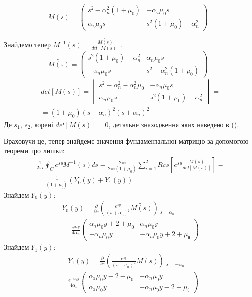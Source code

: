 \begin{equation}
    M(s) = \begin{pmatrix}
        s^2 -\alpha_n^2(1 + \mu_0) & -\alpha_n \mu_0 s \\
        \alpha_n \mu_0 s & s^2 (1 + \mu_0) -\alpha_n^2
     \end{pmatrix}
\end{equation}

Знайдемо тепер $M^{-1}(s) = \frac{\widetilde{M(s)}}{det[M(s)]}$.
\begin{equation}
    \widetilde{M(s)} = \begin{pmatrix}
        s^2 (1 + \mu_0) -\alpha_n^2 & \alpha_n \mu_0 s \\
        -\alpha_n \mu_0 s & s^2 -\alpha_n^2(1 + \mu_0)
     \end{pmatrix}
\end{equation}
\begin{align}
    &det[M(s)] = \begin{vmatrix}
        s^2 - \alpha_n^2 - \alpha_n^2\mu_0 & -\alpha_n \mu_0 s \\
        \alpha_n \mu_0 s & s^2 (1 + \mu_0) -\alpha_n^2
     \end{vmatrix} = \nonumber \\
    &=(1+\mu_0)(s - \alpha_n)^2(s + \alpha_n)^2
\end{align}
Де $s_1$, $s_2$, корені $det[M(s)]=0$, детальне знаходження яких наведено в ().

Враховучи це, тепер знайдемо значення фундаментальної матрицю за допомогою теореми про лишки:
\begin{align*}
    &\frac{1}{2\pi i} \oint_C e^{sy} M^{-1}(s)ds = \frac{2 \pi i}{2 \pi i (1 + \mu_0)} \sum_{i=1}^{2} Res\left[ e^{sy} \frac{\widetilde{M(s)}}{det[M(s)]} \right] = \\
    & = \frac{1}{(1 + \mu_0)} \left(Y_0(y) + Y_1(y) \right)
\end{align*}
Знайдем $Y_0(y)$:
\begin{align}
    &Y_0(y) =  \frac{\partial}{\partial s} \left( \frac{e^{sy}}{(s+\alpha_n)^2} \widetilde{M(s)} \right) \Big|_{s=\alpha_n} = \nonumber \\
    &=\frac{e^{\alpha_n y}}{4\alpha_n} \begin{pmatrix}
    \alpha_n \mu_0 y + 2 + \mu_0 & \alpha_n \mu_0 y \\
    -\alpha_n \mu_0 y & -\alpha_n \mu_0 y + 2 + \mu_0
    \end{pmatrix}
\end{align}
Знайдем $Y_1(y)$:
\begin{align}
    &Y_1(y) = \frac{\partial}{\partial s} \left(\frac{e^{sy}}{(s-\alpha_n)^2} \widetilde{M(s)} \right) \Big|_{s=-\alpha_n} = \nonumber \\
    =&\frac{e^{-\alpha_n y}}{4\alpha_n} \begin{pmatrix}
    \alpha_n \mu_0 y - 2 - \mu_0 & -\alpha_n \mu_0 y \\
    \alpha_n \mu_0 y & -\alpha_n \mu_0 y - 2 - \mu_0
    \end{pmatrix}
\end{align}

